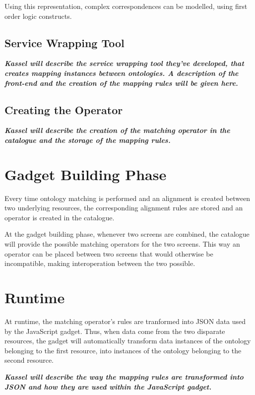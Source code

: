 Using this representation, complex correspondences can be modelled, using first order logic constructs.

\subsection{Service Wrapping Tool}
\textbf{\textit{Kassel will describe the service wrapping tool they've developed, that creates mapping instances between ontologies. 
A description of the front-end and the creation of the mapping rules will be given here.}}

\subsection{Creating the Operator}

\textbf{\textit{Kassel will describe the creation of the matching operator in the catalogue and the storage of the mapping rules.}}

\section{Gadget Building Phase}
\label{sec:gadgetbuilding}
Every time ontology matching is performed and an alignment is created between two underlying resources, the corresponding alignment rules are stored and an operator is created in the catalogue. 

At the gadget building phase, whenever two screens are combined, the catalogue will provide the possible matching operators for the two screens. This way an operator can be placed between two screens that would otherwise be incompatible, making interoperation between the two possible.

\section{Runtime} 
\label{sec:runtime}
At runtime, the matching operator's rules are tranformed into JSON data used by the JavaScript gadget. Thus, when data come from the two disparate resources, the gadget will automatically transform data instances of the ontology belonging to the first resource, into instances of the ontology belonging to the second resource.

\textbf{\textit{Kassel will describe the way the mapping rules are transformed into JSON and how they are used within the JavaScript gadget.}}